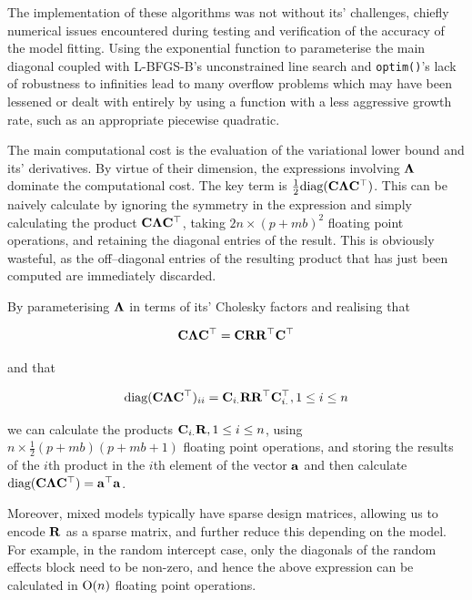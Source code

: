 The implementation of these algorithms was not without its' challenges, chiefly numerical issues encountered during testing and verification of the accuracy of the model fitting. Using the exponential function to parameterise the main diagonal coupled with L-BFGS-B's unconstrained line search and \texttt{optim()}'s lack of robustness to infinities lead to many overflow problems which may have been lessened or dealt with entirely by using a function with a less aggressive growth rate, such as an appropriate piecewise quadratic.
	
The main computational cost is the evaluation of the variational lower bound and its' derivatives. By
virtue of their dimension, the expressions involving ${\boldsymbol \Lambda}$ dominate the computational cost. The key
term is $\frac{1}{2} \text{diag}({\bf C} {\boldsymbol \Lambda} {\bf C}^\top)$. This can be naively calculate by ignoring the
symmetry in the expression and simply calculating the product ${\bf C} {\boldsymbol \Lambda} {\bf C}^\top$, taking $2 n
\times (p + m b)^2$ floating point operations, and retaining the diagonal entries of the result. This is
obviously wasteful, as the off--diagonal entries of the resulting product that has just been computed
are immediately discarded.
	
By parameterising ${\boldsymbol \Lambda}$ in terms of its' Cholesky factors and realising that

\begin{equation}
	{\bf C} {\boldsymbol\Lambda} {\bf C}^\top = {\bf C} {\bf R} {\bf R}^\top {\bf C}^\top
\end{equation}
	
\noindent and that

\begin{equation}
	\text{diag}({\bf C} {\boldsymbol \Lambda} {\bf C}^\top)_{ii} = {\bf C}_{i .} {\bf R} {\bf R}^\top {\bf C}_{i .}^\top, 1 \leq i \leq n
\end{equation}
	
\noindent we can calculate the products ${\bf C}_{i .} {\bf R}, 1 \leq i \leq n$, using $n \times \frac{1}{2}(p + m
b)(p + m b   + 1)$ floating point operations, and storing the results of the $i$th product in the $i$th
element of the   vector ${\bf a}$ and then calculate $\text{diag}({\bf C} {\boldsymbol \Lambda} {\bf C}^\top) = {\bf a}^\top {\bf a}$.
	
Moreover, mixed models typically have sparse design matrices, allowing us to encode ${\bf R}$ as a sparse matrix, and	further reduce   this depending on the model. For example, in the random intercept case, only the diagonals of the random effects block need to be non-zero, and hence the above expression can be calculated in
$\text{O}(n)$ floating point operations.
	
